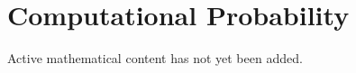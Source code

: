 
\section{Computational Probability}

\begin{remark*}
Active mathematical content has not yet been added.
\end{remark*}
